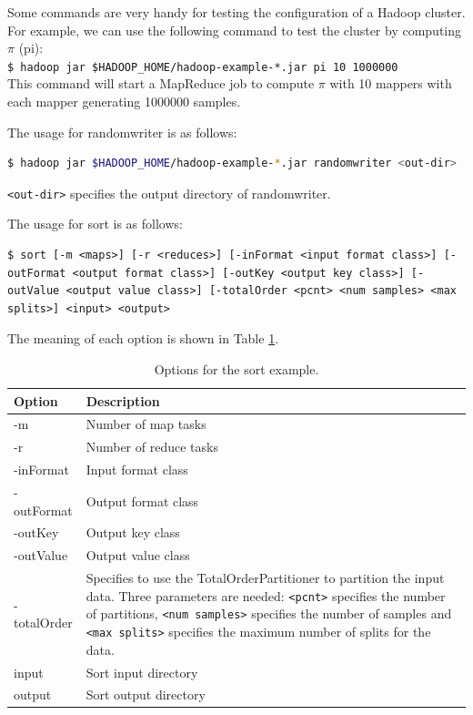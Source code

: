 Some commands are very handy for testing the configuration of a Hadoop cluster. For example, we can use the following command to test the cluster by computing $\pi$ (pi): \\
\verb|$ hadoop jar $HADOOP_HOME/hadoop-example-*.jar pi 10 1000000| \\
This command will start a MapReduce job to compute $\pi$ with 10 mappers with each mapper generating 1000000 samples.

The usage for randomwriter is as follows:
\lstset{style=bashstyle}
\begin{lstlisting}[language=bash]
$ hadoop jar $HADOOP_HOME/hadoop-example-*.jar randomwriter <out-dir>
\end{lstlisting}
\verb|<out-dir>| specifies the output directory of randomwriter.

The usage for sort is as follows: 
\lstset{style=bashstyle}
\begin{lstlisting}
$ sort [-m <maps>] [-r <reduces>] [-inFormat <input format class>] [-outFormat <output format class>] [-outKey <output key class>] [-outValue <output value class>] [-totalOrder <pcnt> <num samples> <max splits>] <input> <output>
\end{lstlisting}

The meaning of each option is shown in Table \ref{tbl:sort}.
\begin{table}[ht]
  \centering
  \begin{tabular}{ll}
    \toprule
    \textbf{Option} & \textbf{Description} \\ \midrule
      -m & Number of map tasks \\
      -r & Number of reduce tasks \\
      -inFormat & Input format class \\
      -outFormat & Output format class \\
      -outKey & Output key class \\
      -outValue & Output value class \\
      -totalOrder & \begin{minipage}[t]{0.8\textwidth}Specifies to use the TotalOrderPartitioner to partition the input data. Three parameters are needed: \verb|<pcnt>| specifies the number of partitions, \verb|<num samples>| specifies the number of samples and \verb|<max splits>| specifies the maximum number of splits for the data.\end{minipage} \\
      input & Sort input directory \\
      output & Sort output directory \\ \bottomrule
    \end{tabular}
    \caption{Options for the sort example.}\label{tbl:sort}
  \end{table}

